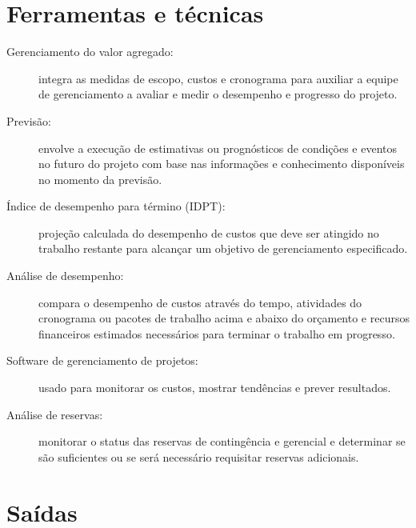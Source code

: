 \section{Ferramentas e técnicas}

\begin{description}
	
	\item[Gerenciamento do valor agregado:] integra as medidas de escopo, custos e cronograma para auxiliar a equipe de gerenciamento a avaliar e medir o desempenho e progresso do projeto.
	
	\item[Previsão:] envolve a execução de estimativas ou prognósticos de condições e eventos no futuro do projeto com base nas informações e conhecimento disponíveis no momento da previsão.
	
	\item[Índice de desempenho para término (IDPT):] projeção calculada do desempenho de custos que deve ser atingido no trabalho restante para alcançar um objetivo de gerenciamento especificado.
	
	\item[Análise de desempenho:] compara o desempenho de custos através do tempo, atividades do cronograma ou pacotes de trabalho acima e abaixo do orçamento e recursos financeiros estimados necessários para terminar o trabalho em progresso.
	
	\item[Software de gerenciamento de projetos:] usado para monitorar os custos, mostrar tendências e prever resultados.
	
	\item[Análise de reservas:] monitorar o status das reservas de contingência e gerencial e determinar se são suficientes ou se será necessário requisitar reservas adicionais.
	
\end{description}

\section{Saídas}

